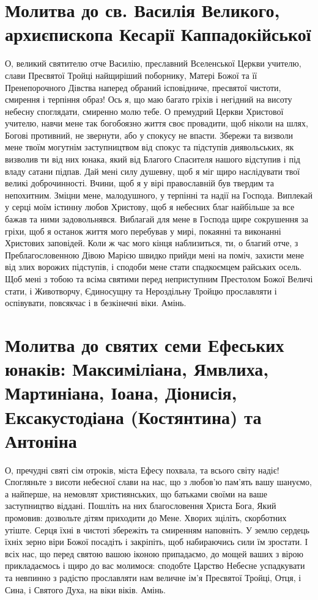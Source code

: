 \documentclass[chapters.tex]{subfiles}
\begin{document}
\section{Молитва до св. Василія Великого, архиєпископа Кесарії Каппадокійської}
О, великий святителю отче Василію, преславний Вселенської Церкви учителю, слави Пресвятої Тройці найщиріший поборнику, Матері Божої та її Пренепорочного Дівства наперед обраний ісповідниче, пресвятої чистоти, смирення і терпіння образ! Ось я, що маю багато гріхів і негідний на висоту небесну споглядати, смиренно молю тебе. О премудрий Церкви Христової учителю, навчи мене так богобоязно життя своє провадити, щоб ніколи на шлях, Богові противний, не звернути, або у спокусу не впасти. Збережи та визволи мене твоїм могутнім заступництвом від спокус та підступів диявольських, як визволив ти від них юнака, який від Благого Спасителя нашого відступив і під владу сатани підпав. Дай мені силу душевну, щоб я міг щиро наслідувати твої великі доброчинності. Вчини, щоб я у вірі православній був твердим та непохитним. Зміцни мене, малодушного, у терпінні та надії на Господа. Виплекай у серці моїм істинну любов Христову, щоб я небесних благ найбільше за все бажав та ними задовольнявся. Виблагай для мене в Господа щире сокрушення за гріхи, щоб я останок життя мого перебував у мирі, покаянні та виконанні Христових заповідей. Коли ж час мого кінця наблизиться, ти, о благий отче, з Преблагословенною Дівою Марією швидко прийди мені на поміч, захисти мене від злих ворожих підступів, і сподоби мене стати спадкоємцем райських осель. Щоб мені з тобою та всіма святими перед неприступним Престолом Божої Величі стати, і Животворчу, Єдиносущну та Нероздільну Тройцю прославляти і оспівувати, повсякчас і в безкінечні віки. Амінь.

\section{Молитва до святих семи Ефеських юнаків: Максиміліана, Ямвлиха, Мартиніана, Іоана, Діонисія, Ексакустодіана (Костянтина) та Антоніна}
О, пречудні святі сім отроків, міста Ефесу похвала, та всього світу надіє! Спогляньте з висоти небесної слави на нас, що з любов’ю пам’ять вашу шануємо, а найперше, на немовлят християнських, що батьками своїми на ваше заступництво віддані. Пошліть на них благословення Христа Бога, Який промовив: дозвольте дітям приходити до Мене. Хворих зціліть, скорботних утіште. Серця їхні в чистоті збережіть та смиренням наповніть. У землю сердець їхніх зерно віри Божої посадіть і закріпіть, щоб набираючись сили їм зростати. І всіх нас, що перед святою вашою іконою припадаємо, до мощей ваших з вірою прикладаємось і щиро до вас молимося: сподобте Царство Небесне успадкувати та невпинно з радістю прославляти нам величне ім’я Пресвятої Тройці, Отця, і Сина, і Святого Духа, на віки віків. Амінь.
\end{document}
